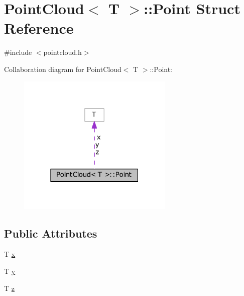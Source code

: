 \hypertarget{struct_point_cloud_1_1_point}{\section{Point\-Cloud$<$ T $>$\-:\-:Point Struct Reference}
\label{struct_point_cloud_1_1_point}
}


{\ttfamily \#include $<$pointcloud.\-h$>$}



Collaboration diagram for Point\-Cloud$<$ T $>$\-:\-:Point\-:
\nopagebreak
\begin{figure}[H]
\begin{center}
\leavevmode
\includegraphics[width=210pt]{struct_point_cloud_1_1_point__coll__graph}
\end{center}
\end{figure}
\subsection*{Public Attributes}
\begin{DoxyCompactItemize}
\item 
T \hyperlink{struct_point_cloud_1_1_point_a4c9755e331a4b3c82f69bf73573a85cb}{x}
\item 
T \hyperlink{struct_point_cloud_1_1_point_a04e6140b52712a7fcabdb3b8d06040fc}{y}
\item 
T \hyperlink{struct_point_cloud_1_1_point_a606a44d077bc9f483cf6ff58c4896a14}{z}
\end{DoxyCompactItemize}


